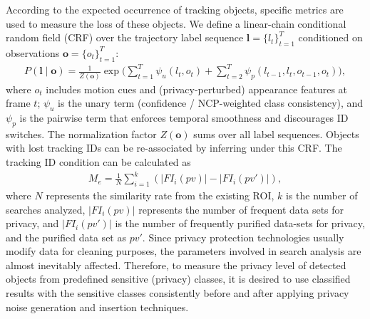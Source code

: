 \documentclass[trans]{IEEEtran}
\begin{document}
According to the expected occurrence of tracking objects, specific metrics are used to measure the loss of these objects. We define a linear-chain conditional random field (CRF) over the trajectory label sequence $\mathbf{l}=\{l_t\}_{t=1}^T$ conditioned on observations $\mathbf{o}=\{o_t\}_{t=1}^T$:
\begin{eqnarray}\label{equ:Stt}
P(\mathbf{l} \mid \mathbf{o}) = \frac{1}{Z(\mathbf{o})} \exp\Big( \sum_{t=1}^T \psi_u(l_t, o_t) + \sum_{t=2}^T \psi_p(l_{t-1}, l_t, o_{t-1}, o_t) \Big),
\end{eqnarray}
where $o_t$ includes motion cues and (privacy-perturbed) appearance features at frame $t$; $\psi_u$ is the unary term (confidence / NCP-weighted class consistency), and $\psi_p$ is the pairwise term that enforces temporal smoothness and discourages ID switches. The normalization factor $Z(\mathbf{o})$ sums over all label sequences. Objects with lost tracking IDs can be re-associated by inferring under this CRF. The tracking ID condition can be calculated as
\begin{eqnarray}\label{equ:Medet}
M_e = \frac{1}{N} \sum^{k}_{i=1} (|FI_i(pv)|-|FI_i(pv')|),
\end{eqnarray}
where $N$ represents the similarity rate from the existing ROI, $k$ is the number of searches analyzed,  $|FI_i(pv)|$ represents the number of frequent data sets for privacy, and $|FI_i(pv')|$  is the number of frequently purified data-sets for privacy, and the purified data set as $pv'$. Since privacy protection technologies usually modify data for cleaning purposes, the parameters involved in search analysis are almost inevitably affected. Therefore, to measure the privacy level of detected objects from predefined sensitive (privacy) classes, it is desired to use classified results with the sensitive classes consistently before and after applying privacy noise generation and insertion techniques.
\end{document}
